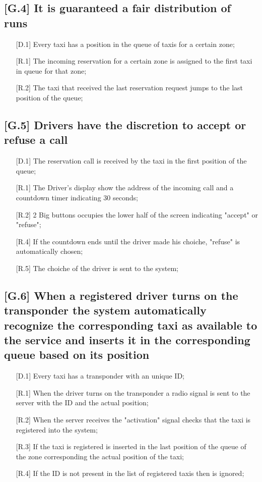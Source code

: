 \documentclass[12pt,a4paper]{book}
\begin{document}
			\subsection{[G.4] It is guaranteed a fair distribution of runs}
			\begin{itemize}
				\item[\textbullet] [D.1] Every taxi has a position in the queue of taxis for a certain zone;
				\item[\textbullet] [R.1] The incoming reservation for a certain zone is assigned to the first taxi in queue for that zone;
				\item[\textbullet] [R.2] The taxi that received the last reservation request jumps to the last position of the queue;
			\end{itemize}
			\subsection{[G.5] Drivers have the discretion to accept or refuse a call}
			\begin{itemize}
				\item[\textbullet] [D.1] The reservation call is received by the taxi in the first position of the queue;
				\item[\textbullet] [R.1] The Driver's display show the address of the incoming call and a countdown timer indicating 30 seconds;
				\item[\textbullet] [R.2] 2 Big buttons occupies the lower half of the screen indicating "accept" or "refuse";
				\item[\textbullet] [R.4] If the countdown ends until the driver made his choiche, "refuse" is automatically chosen; 
				\item[\textbullet] [R.5] The choiche of the driver is sent to the system;
			\end{itemize}
			\subsection{[G.6] When a registered driver turns on the transponder the system automatically recognize the corresponding taxi as available to the service and inserts it in the corresponding queue based on its position}
			\begin{itemize}
				\item[\textbullet] [D.1] Every taxi has a transponder with an unique ID;
				\item[\textbullet] [R.1] When the driver turns on the transponder a radio signal is sent to the server with the ID and the actual position;
				\item[\textbullet] [R.2] When the server receives the "activation" signal checks that the taxi is registered into the system;
				\item[\textbullet] [R.3] If the taxi is registered is inserted in the last position of the queue of the zone corresponding the actual position of the taxi;
				\item[\textbullet] [R.4] If the ID is not present in the list of registered taxis then is ignored;
			\end{itemize}
\end{document}
